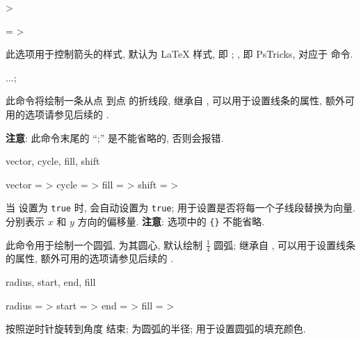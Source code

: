 \documentclass[
  hyper, lang=cn, 
  class=l3dox, 
]{../../zlatex/code/ztex}
\begin{document}
\begin{keyval}[parent=ztool/../vector]{>}
  \begin{syntax}
    \texttt{} = >
  \end{syntax}
  此选项用于控制箭头的样式, 默认为 \LaTeX{} 样式, 即 ; 
  , 即 PsTricks, 对应于  命令.
\end{keyval}



\begin{function}[added=2025-05-13]{\zdraw}
  \begin{syntax}
     ...;
  \end{syntax}
  此命令将绘制一条从点  到点  的折线段,  继承自 , 
  可以用于设置线条的属性, 额外可用的选项请参见后续的 .\par 
  \textbf{注意}: 此命令末尾的 ``;'' 是不能省略的, 否则会报错. 
\end{function}


\begin{keyval}[parent=ztool/../zdraw]{vector, cycle, fill, shift}
  \begin{syntax}
    vector = >
    cycle  = >
    fill   = >
    shift  = >
  \end{syntax}
  当  设置为 \texttt{true} 时,  会自动设置为 \texttt{true}; 
   用于设置是否将每一个子线段替换为向量.  分别表示 $x$ 和 $y$ 方向的偏移量. 
  \textbf{注意}:  选项中的 \texttt{\{\}} 不能省略.
\end{keyval}


\begin{function}[added=2025-05-13]{\zarc}
  \begin{syntax}
  \end{syntax}
  此命令用于绘制一个圆弧, \texttt{} 为其圆心, 默认绘制 $\frac{1}{4}$ 圆弧; 
   继承自 , 
  可以用于设置线条的属性, 额外可用的选项请参见后续的 .
\end{function}


\begin{keyval}[parent=ztool/../zarc]{radius, start, end, fill}
  \begin{syntax}
    radius = >
    start  = >
    end    = >
    fill   = >
  \end{syntax}
   按照逆时针旋转到角度  结束;  为圆弧的半径;
   用于设置圆弧的填充颜色.
\end{keyval}
\end{document}
